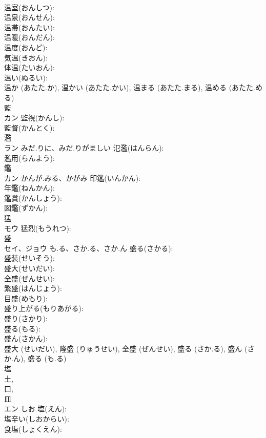 \documentclass[8pt]{extreport}
\begin{document}
\begin{CJK}{UTF8}{min}
\\	温室(おんしつ): 
\\	温泉(おんせん): 
\\	温帯(おんたい): 
\\	温暖(おんだん): 
\\	温度(おんど): 
\\	気温(きおん): 
\\	体温(たいおん): 
\\	温い(ぬるい): 
\\	温か (あたた.か), 温かい (あたた.かい), 温まる (あたた.まる), 温める (あたた.める)
\\	監			
\\	カン		監視(かんし): 
\\	監督(かんとく): 
\\	濫			
\\	ラン	みだ.りに、みだ.りがましい	氾濫(はんらん): 
\\	濫用(らんよう): 
\\	鑑			
\\	カン	かんが.みる、かがみ	印鑑(いんかん): 
\\	年鑑(ねんかん): 
\\	鑑賞(かんしょう): 
\\	図鑑(ずかん): 
\\	猛			
\\	モウ		猛烈(もうれつ): 
\\	盛			
\\	セイ、ジョウ	も.る、さか.る、さか.ん	盛る(さかる): 
\\	盛装(せいそう): 
\\	盛大(せいだい): 
\\	全盛(ぜんせい): 
\\	繁盛(はんじょう): 
\\	目盛(めもり): 
\\	盛り上がる(もりあがる): 
\\	盛り(さかり): 
\\	盛る(もる): 
\\	盛ん(さかん): 
\\	盛大 (せいだい), 隆盛 (りゅうせい), 全盛 (ぜんせい), 盛る (さか.る), 盛ん (さか.ん), 盛る (も.る)
\\	塩			
\\	土, 
\\	口, 
\\	皿 
\\	エン	しお	塩(えん): 
\\	塩辛い(しおからい): 
\\	食塩(しょくえん): 

\end{CJK}
\end{document}

